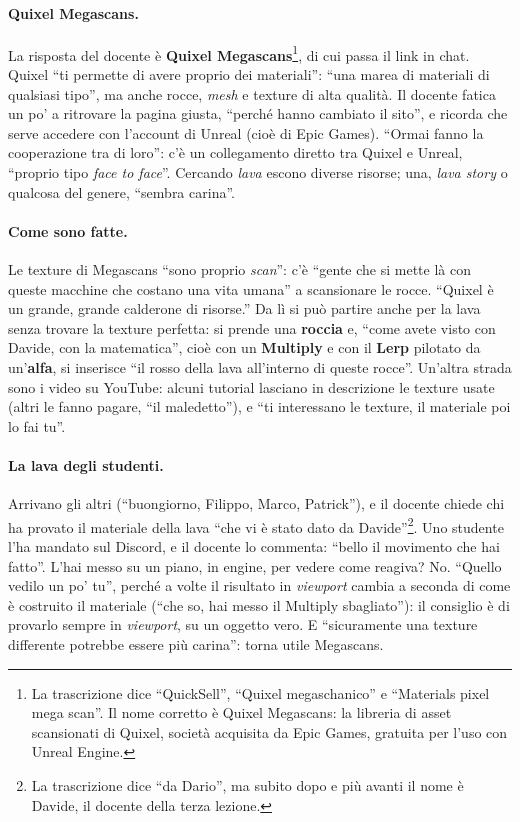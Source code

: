 \paragraph{Quixel Megascans.} La risposta del docente è \textbf{Quixel
Megascans}\footnote{La trascrizione dice ``QuickSell'', ``Quixel megaschanico'' e
``Materials pixel mega scan''. Il nome corretto è Quixel Megascans: la libreria di
asset scansionati di Quixel, società acquisita da Epic Games, gratuita per l'uso con
Unreal Engine.}, di cui passa il link in chat. Quixel ``ti permette di avere proprio
dei materiali'': ``una marea di materiali di qualsiasi tipo'', ma anche rocce,
\emph{mesh} e texture di alta qualità. Il docente fatica un po' a ritrovare la pagina
giusta, ``perché hanno cambiato il sito'', e ricorda che serve accedere con l'account
di Unreal (cioè di Epic Games). ``Ormai fanno la cooperazione tra di loro'': c'è un
collegamento diretto tra Quixel e Unreal, ``proprio tipo \emph{face to face}''. Cercando
\emph{lava} escono diverse risorse; una, \emph{lava story} o qualcosa del genere,
``sembra carina''.

\paragraph{Come sono fatte.} Le texture di Megascans ``sono proprio \emph{scan}'': c'è
``gente che si mette là con queste macchine che costano una vita umana'' a
scansionare le rocce. ``Quixel è un grande, grande calderone di risorse.'' Da lì si
può partire anche per la lava senza trovare la texture perfetta: si prende una
\textbf{roccia} e, ``come avete visto con Davide, con la matematica'', cioè con un
\textbf{Multiply} e con il \textbf{Lerp} pilotato da un'\textbf{alfa}, si inserisce
``il rosso della lava all'interno di queste rocce''. Un'altra strada sono i video su
YouTube: alcuni tutorial lasciano in descrizione le texture usate (altri le fanno
pagare, ``il maledetto''), e ``ti interessano le texture, il materiale poi lo fai tu''.

\paragraph{La lava degli studenti.} Arrivano gli altri (``buongiorno, Filippo, Marco,
Patrick''), e il docente chiede chi ha provato il materiale della lava ``che vi è stato
dato da Davide''\footnote{La trascrizione dice ``da Dario'', ma subito dopo e più
avanti il nome è Davide, il docente della terza lezione.}. Uno studente l'ha mandato sul
Discord, e il docente lo commenta: ``bello il movimento che hai fatto''. L'hai messo
su un piano, in engine, per vedere come reagiva? No. ``Quello vedilo un po' tu'',
perché a volte il risultato in \emph{viewport} cambia a seconda di come è costruito il
materiale (``che so, hai messo il Multiply sbagliato''): il consiglio è di provarlo
sempre in \emph{viewport}, su un oggetto vero. E ``sicuramente una texture differente
potrebbe essere più carina'': torna utile Megascans.


